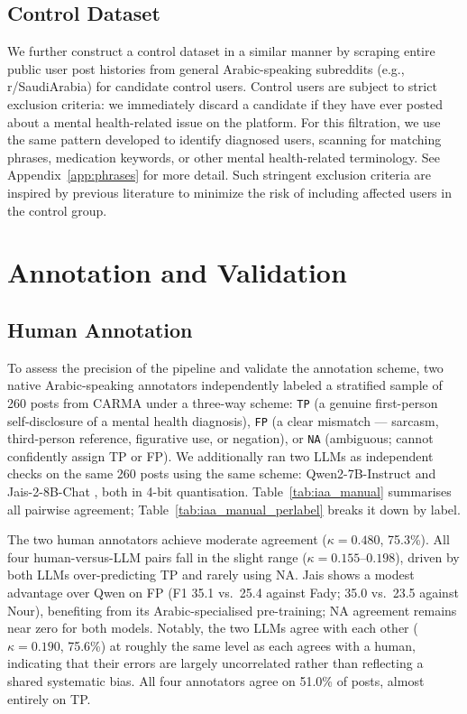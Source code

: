 \documentclass[11pt]{article}
\begin{document}
\subsection{Control Dataset}

We further construct a control dataset in a similar manner by scraping entire public user post histories from general Arabic-speaking subreddits (e.g., r/SaudiArabia) for candidate control users. Control users are subject to strict exclusion criteria: we immediately discard a candidate if they have ever posted about a mental health-related issue on the platform. For this filtration, we use the same pattern developed to identify diagnosed users, scanning for matching phrases, medication keywords, or other mental health-related terminology. See Appendix~\ref{app:phrases} for more detail. Such stringent exclusion criteria are inspired by previous literature \cite{cohan-etal-2018-smhd} to minimize the risk of including affected users in the control group.



\section{Annotation and Validation}
\label{sec:annotation}

\subsection{Human Annotation}
\label{subsec:human_annotation}

To assess the precision of the pipeline and validate the annotation
scheme, two native Arabic-speaking annotators independently labeled a
stratified sample of 260 posts from CARMA under a three-way scheme:
\texttt{TP} (a genuine first-person self-disclosure of a mental health
diagnosis), \texttt{FP} (a clear mismatch — sarcasm, third-person
reference, figurative use, or negation), or \texttt{NA} (ambiguous;
cannot confidently assign TP or FP). We additionally ran two LLMs
as independent checks on the same 260 posts using the same scheme:
Qwen2-7B-Instruct \cite{qwen2025qwen25technicalreport} and
Jais-2-8B-Chat \cite{jais2_2025}, both in 4-bit quantisation.
Table~\ref{tab:iaa_manual} summarises all pairwise agreement;
Table~\ref{tab:iaa_manual_perlabel} breaks it down by label.

The two human annotators achieve moderate agreement ($\kappa = 0.480$,
75.3\%). All four human-versus-LLM pairs fall in the slight range
($\kappa = 0.155$--$0.198$), driven by both LLMs over-predicting TP
and rarely using NA. Jais shows a modest advantage over Qwen on FP
(F1 35.1 vs.\ 25.4 against Fady; 35.0 vs.\ 23.5 against Nour),
benefiting from its Arabic-specialised pre-training; NA agreement
remains near zero for both models. Notably, the two LLMs agree with
each other ($\kappa = 0.190$, 75.6\%) at roughly the same level as
each agrees with a human, indicating that their errors are largely
uncorrelated rather than reflecting a shared systematic bias.
All four annotators agree on 51.0\% of posts, almost entirely on TP.
\end{document}
